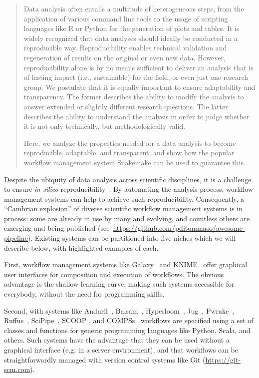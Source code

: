 \documentclass[parskip=half, DIV=18]{scrartcl}
\let\plainurl\url
\renewcommand{\url}[1]{\protect\plainurl{#1}}
\begin{document}
\begin{abstract}
	Data analysis often entails a multitude of heterogeneous steps, from the application of various command line tools to the usage of scripting languages like R or Python for the generation of plots and tables.
	It is widely recognized that data analyses should ideally be conducted in a reproducible way.
	Reproducibility enables technical validation and regeneration of results on the original or even new data.
	However, reproducibility alone is by no means sufficient to deliver an analysis that is of lasting impact (i.e., sustainable) for the field, or even just one research group.
	We postulate that it is equally important to ensure adaptability and transparency.
	The former describes the ability to modify the analysis to answer extended or slightly different research questions.
	The latter describes the ability to understand the analysis in order to judge whether it is not only technically, but methodologically valid.

	Here, we analyze the properties needed for a data analysis to become reproducible, adaptable, and transparent, and show how the popular workflow management system Snakemake can be used to guarantee this.
\end{abstract}

Despite the ubiquity of data analysis across scientific disciplines, it is a challenge to ensure \emph{in silico} reproducibility~\parencite{Mesirov2010,Baker2016,Munaf__2017}.
By automating the analysis process, workflow management systems can help to achieve such reproducibility.
Consequently, a ``Cambrian explosion'' of diverse scientific workflow management systems is in process; some are already in use by many and evolving, and countless others are emerging and being published (see~\url{https://github.com/pditommaso/awesome-pipeline}).
Existing systems can be partitioned into five niches which we will describe below, with highlighted examples of each.

First, workflow management systems like Galaxy~\parencite{Afgan2018} and KNIME~\parencite{wiswedel2007} offer graphical user interfaces for composition and execution of workflows.
The obvious advantage is the shallow learning curve, making such systems accessible for everybody, without the need for programming skills.

Second, with systems like Anduril~\parencite{Cervera2019}, Balsam~\parencite{papka2018}, Hyperloom~\parencite{cima2018hyperloom}, Jug~\parencite{Coelho_2017}, Pwrake~\parencite{Tanaka_2010}, Ruffus~\parencite{Goodstadt2010}, SciPipe~\parencite{Lampa2019}, SCOOP \parencite{SCOOP_XSEDE2014}, and COMPSs~\parencite{Lordan_2013} workflows are specified using a set of classes and functions for generic programming languages like Python, Scala, and others.
Such systems have the advantage that they can be used without a graphical interface (e.g. in a server environment), and that workflows can be straightforwardly managed with version control systems like Git (\url{https://git-scm.com}).
\end{document}
